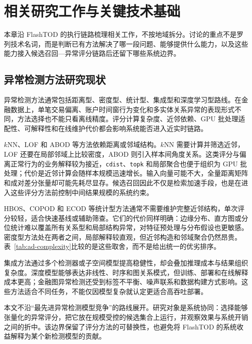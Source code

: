 
\chapter{相关研究工作与关键技术基础}

本章沿 FlashTOD 的执行链路梳理相关工作，不按地域拆分。讨论的重点不是罗列技术名词，而是判断已有方法解决了哪一段问题、能够提供什么能力，以及这些能力接入候选召回---异常评分链路后还留下哪些系统边界。

\section{异常检测方法研究现状}

异常检测方法通常包括距离型、密度型、统计型、集成型和深度学习型路线\citep{chandola2009survey,markou2003novelty,aggarwal2017outlier}。在金融数据上，单笔交易偏离、账户时间窗行为变化和多实体关系异常的表现形式不同，方法选择也不能只看离线精度。评分计算复杂度、近邻依赖、GPU 批处理适配性、可解释性和在线维护代价都会影响系统能否进入近实时链路\citep{phua2010fraudsurvey,akoglu2015graph,song2024financialriskstgnn}。

$k$NN、LOF 和 ABOD 等方法依赖距离或邻域结构。$k$NN 需要计算并筛选近邻，LOF 还要在局部邻域上比较密度，ABOD 则引入样本间角度关系。这类评分与偏离正常行为的业务解释较为接近，\texttt{cdist}、\texttt{topk} 和局部聚合也便于组织为 GPU 批处理；代价是近邻计算会随样本规模迅速增长\citep{breunig2000lof,angiulli2002fast,zhao2022tod}。输入向量可能不大，全量距离矩阵和成对差分张量却可能先耗尽显存。候选召回因此不仅是检索加速手段，也是在进入这些评分方法前控制中间结果规模的系统约束。

HBOS、COPOD 和 ECOD 等统计型方法通常不需要维护完整近邻结构，单次评分较轻，适合快速基线或辅助筛查。它们的代价同样明确：边缘分布、直方图或分位统计难以覆盖所有关系型和局部结构异常，对特征预处理与分布假设也更敏感。密度型方法处在两者之间，局部解释较直观，但近邻构造和邻域聚合仍然昂贵。表~\ref{tab:ad-complexity}比较的是这些取舍，而不是给出统一的优劣排序。

集成方法通过多个检测器或子空间模型提高稳健性，却会叠加推理成本与结果组织复杂度。深度模型能够表达非线性、时序和图关系模式，但训练、部署和在线解释成本更高；金融图异常检测还受到标签不平衡、噪声联系和数据构建方式影响\citep{chen2021graphanomaly,li2023gnnfraud,yu2024rwkgnn}。这些方法适合不同任务，不能仅因模型复杂就认定更适合高吞吐部署。

本文不沿“最先进异常检测模型竞争”的路线展开。研究对象是系统协同：选择能够张量化的异常评分，把它放在规模受控的候选集合上运行，并观察效果与系统开销之间的折中。该边界保留了评分方法的可替换性，也避免将 FlashTOD 的系统收益解释为某个新检测模型的贡献。

